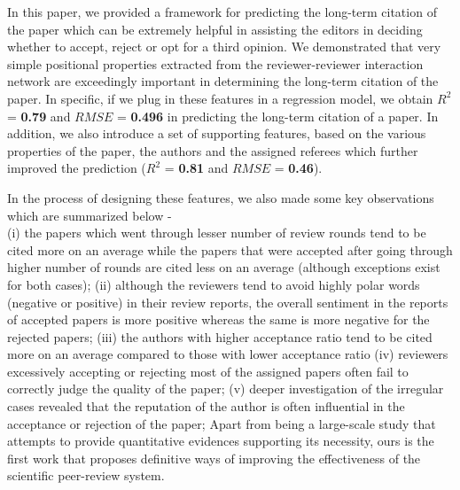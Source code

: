 
In this paper, we provided a framework for predicting the long-term citation of the paper which can be extremely helpful in assisting the editors in deciding whether to accept, reject or opt for a third opinion. We demonstrated that very simple positional properties extracted from the reviewer-reviewer interaction network are exceedingly important in determining the long-term citation of the paper. In specific, if we plug in these features in a regression model, we obtain $R^2$ = \textbf{0.79} and $RMSE$ = \textbf{0.496} in predicting the long-term citation of a paper. In addition, we also introduce a set of supporting features, based on the various properties of the paper, the authors and the assigned referees which further improved the prediction ($R^2$ = \textbf{0.81} and $RMSE$ = \textbf{0.46}). 

In the process of designing these features, we also made some key observations which are summarized below - \\ 
(i) the papers which went through lesser number of review rounds tend to be cited more on an average while the papers that were accepted after going through higher number of rounds are cited less on an average (although exceptions exist for both cases); 
(ii) although the reviewers tend to avoid highly polar words (negative or positive) in their review reports, the overall sentiment in the reports of accepted papers is more positive whereas the same is more negative for the rejected papers; 
(iii) the authors with higher acceptance ratio tend to be cited more on an average compared to those with lower acceptance ratio 
(iv) reviewers excessively accepting or rejecting most of the assigned papers often fail to correctly judge the quality of the paper;
(v) deeper investigation of the irregular cases revealed that the reputation of the author is often influential in the acceptance or rejection of the paper;
Apart from being a large-scale study that attempts to provide quantitative evidences supporting its necessity, ours is the first work that proposes definitive ways of improving the effectiveness of the scientific peer-review system.  

\medskip 
